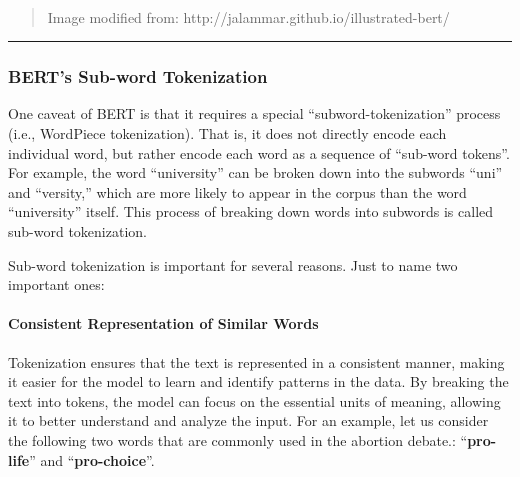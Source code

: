 \documentclass[11pt]{article}
\begin{document}
    \begin{center}
    \end{center}
    { \hspace*{\fill} \\}
    
    \begin{quote}
Image modified from: http://jalammar.github.io/illustrated-bert/
\end{quote}

    \begin{center}\rule{0.5\linewidth}{0.5pt}\end{center}

    \hypertarget{berts-sub-word-tokenization}{%
\subsubsection{\texorpdfstring{\textbf{BERT's Sub-word
Tokenization}}{BERT's Sub-word Tokenization}}\label{berts-sub-word-tokenization}}

One caveat of BERT is that it requires a special
``subword-tokenization'' process (i.e., WordPiece tokenization). That
is, it does not directly encode each individual word, but rather encode
each word as a sequence of ``sub-word tokens''. For example, the word
``university'' can be broken down into the subwords ``uni'' and
``versity,'' which are more likely to appear in the corpus than the word
``university'' itself. This process of breaking down words into subwords
is called sub-word tokenization.

Sub-word tokenization is important for several reasons. Just to name two
important ones:

\hypertarget{consistent-representation-of-similar-words}{%
\paragraph{\texorpdfstring{\textbf{Consistent Representation of Similar
Words}}{Consistent Representation of Similar Words}}\label{consistent-representation-of-similar-words}}

Tokenization ensures that the text is represented in a consistent
manner, making it easier for the model to learn and identify patterns in
the data. By breaking the text into tokens, the model can focus on the
essential units of meaning, allowing it to better understand and analyze
the input. For an example, let us consider the following two words that
are commonly used in the abortion debate.: ``\textbf{pro-life}'' and
``\textbf{pro-choice}''.
\end{document}
